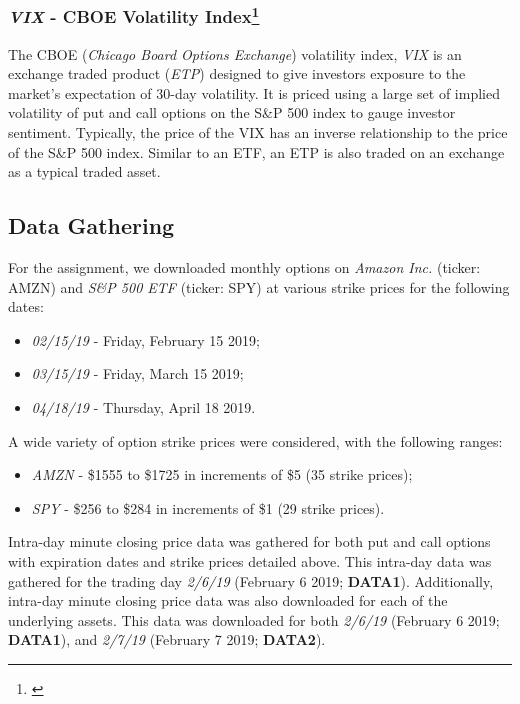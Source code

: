 \documentclass[10pt]{article}
\begin{document}
        \subsubsection[\textit{VIX} - CBOE Volatility Index]{\textit{VIX} - CBOE Volatility Index\footnote{\cite{CBOEChicagoBoardOptionsExchange2019}}}

        The CBOE (\textit{Chicago Board Options Exchange}) volatility index, \textit{VIX} is an exchange traded product (\textit{ETP}) designed to give investors exposure to the market's expectation of 30-day volatility. It is priced using a large set of implied volatility of put and call options on the S\&P 500 index to gauge investor sentiment. Typically, the price of the VIX has an inverse relationship to the price of the S\&P 500 index. Similar to an ETF, an ETP is also traded on an exchange as a typical traded asset.


    \subsection{Data Gathering}

    For the assignment, we downloaded monthly options on \textit{Amazon Inc.} (ticker: AMZN) and \textit{S\&P 500 ETF} (ticker: SPY) at various strike prices for the following dates:
    
    \begin{itemize}
        \item \textit{02/15/19} - Friday, February 15 2019;
        \item \textit{03/15/19} - Friday, March 15 2019;
        \item \textit{04/18/19} - Thursday, April 18 2019.
    \end{itemize}

    A wide variety of option strike prices were considered, with the following ranges:
    
    \begin{itemize}
        \item \textit{AMZN} - \$1555 to \$1725 in increments of \$5 (35 strike prices);
        \item \textit{SPY} - \$256 to \$284 in increments of \$1 (29 strike prices).
    \end{itemize}

    Intra-day minute closing price data was gathered for both put and call options with expiration dates and strike prices detailed above. This intra-day data was gathered for the trading day \textit{2/6/19} (February 6 2019; \textbf{DATA1}). Additionally, intra-day minute closing price data was also downloaded for each of the underlying assets. This data was downloaded for both \textit{2/6/19} (February 6 2019; \textbf{DATA1}), and \textit{2/7/19} (February 7 2019; \textbf{DATA2}).
\end{document}
